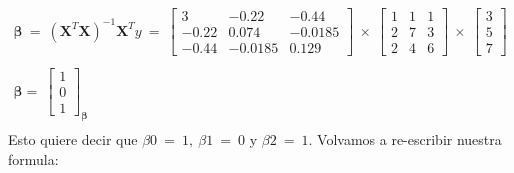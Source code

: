 \documentclass[10pt]{article}
\begin{document}
\begin{gather*}
\\
\\
\boldsymbol{\beta} \ =\ \left( \boldsymbol{X}^{T} \boldsymbol{X}\right)^{-1} \boldsymbol{X}^{T} y\ =\ \begin{bmatrix}
3 & -0.22 & -0.44\\
-0.22 & 0.074 & -0.0185\\
-0.44 & -0.0185 & 0.129
\end{bmatrix} \ \times \ \begin{bmatrix}
1 & 1 & 1\\
2 & 7 & 3\\
2 & 4 & 6
\end{bmatrix} \ \times \ \begin{bmatrix}
3\\
5\\
7
\end{bmatrix} \ \\
\\
\boldsymbol{\beta} =\ \begin{bmatrix}
1\\
0\\
1
\end{bmatrix}_{\boldsymbol{\beta}}\\
\end{gather*}
Esto quiere decir que $\displaystyle \beta 0\ =\ 1,\ \beta 1\ =\ 0$ y $\displaystyle \beta 2\ =\ 1$. Volvamos a re-escribir nuestra formula:
\end{document}
